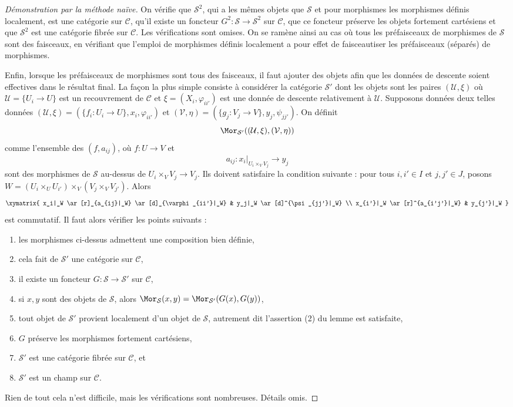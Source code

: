 \begin{proof}[Démonstration par la méthode naïve]
\medskip\noindent
On vérifie que $\mathcal{S}^2$, qui a les mêmes objets que
$\mathcal{S}$ et pour morphismes les morphismes définis localement,
est une catégorie sur $\mathcal{C}$, qu'il existe un foncteur
$G^2 : \mathcal{S} \to \mathcal{S}^2$ sur $\mathcal{C}$,
que ce foncteur préserve les objets fortement cartésiens
et que $\mathcal{S}^2$ est une catégorie fibrée sur $\mathcal{C}$.
Les vérifications sont omises. On se ramène ainsi au cas où tous les
préfaisceaux de morphismes de $\mathcal{S}$ sont des faisceaux, en
vérifiant que l'emploi de morphismes définis localement a pour effet de
faisceautiser les préfaisceaux (séparés) de morphismes.

\medskip\noindent
Enfin, lorsque les préfaisceaux de morphismes sont tous des faisceaux,
il faut ajouter des objets afin que les données de descente soient
effectives dans le résultat final. La façon la plus simple consiste à
considérer la catégorie $\mathcal{S}'$ dont les objets sont les
paires $(\mathcal{U}, \xi)$ où
$\mathcal{U} = \{U_i \to U\}$ est un recouvrement de $\mathcal{C}$ et
$\xi = (X_i, \varphi_{ii'})$ est une donnée de descente relativement à $\mathcal{U}$.
Supposons données deux telles données
$(\mathcal{U}, \xi) = (\{f_i : U_i \to U\},  x_i, \varphi_{ii'})$ et
$(\mathcal{V}, \eta) = (\{g_j : V_j \to V\},  y_j, \psi_{jj'})$.
On définit
$$
\Mor_{\mathcal{S}'}((\mathcal{U}, \xi), (\mathcal{V}, \eta))
$$
comme l'ensemble des $(f, a_{ij})$, où $f : U \to V$ et
$$
a_{ij} :
x_i|_{U_i \times_V V_j}
\longrightarrow
y_j
$$
sont des morphismes de $\mathcal{S}$ au-dessus de $U_i \times_V V_j \to V_j$.
Ils doivent satisfaire la condition suivante : pour tous
$i, i' \in I$ et $j, j' \in J$, posons
$W = (U_i \times_U U_{i'}) \times_V (V_j \times_V V_{j'})$. Alors
$$
\xymatrix{
x_i|_W \ar[r]_{a_{ij}|_W} \ar[d]_{\varphi_{ii'}|_W} &
y_j|_W \ar[d]^{\psi_{jj'}|_W} \\
x_{i'}|_W \ar[r]^{a_{i'j'}|_W} &
y_{j'}|_W
}
$$
est commutatif. Il faut alors vérifier les points suivants :
\begin{enumerate}
\item les morphismes ci-dessus admettent une composition bien définie,
\item cela fait de $\mathcal{S}'$ une catégorie sur $\mathcal{C}$,
\item il existe un foncteur $G : \mathcal{S} \to \mathcal{S}'$ sur $\mathcal{C}$,
\item si $x, y$ sont des objets de $\mathcal{S}$, alors
$\Mor_\mathcal{S}(x, y) = \Mor_{\mathcal{S}'}(G(x), G(y))$,
\item tout objet de $\mathcal{S}'$ provient localement d'un objet de
$\mathcal{S}$, autrement dit l'assertion (2) du lemme est satisfaite,
\item $G$ préserve les morphismes fortement cartésiens,
\item $\mathcal{S}'$ est une catégorie fibrée sur $\mathcal{C}$, et
\item $\mathcal{S}'$ est un champ sur $\mathcal{C}$.
\end{enumerate}
Rien de tout cela n'est difficile, mais les vérifications sont nombreuses. Détails omis.
\end{proof}

